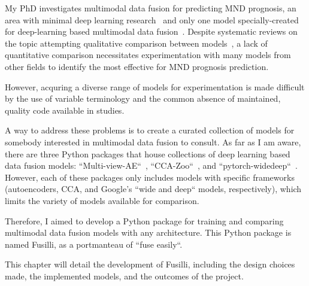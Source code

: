 My PhD investigates multimodal data fusion for predicting MND prognosis, an area with minimal deep learning research~\cite{pancottiDeepLearningMethods2022, mullerExplainableModelsDisease2021} and only one model specially-created for deep-learning based multimodal data fusion~\cite{vanderburghDeepLearningPredictions2017}.
Despite systematic reviews on the topic attempting qualitative comparison between models~\cite{cuiDeepMultimodalFusion2022, gaoSurveyDeepLearning2020, stahlschmidtMultimodalDeepLearning2022, yanDeepMultiviewLearning2021}, a lack of quantitative comparison necessitates experimentation with many models from other fields to identify the most effective for MND prognosis prediction.

However, acquring a diverse range of models for experimentation is made difficult by the use of variable terminology and the common absence of maintained, quality code available in studies.

A way to address these problems is to create a curated collection of models for somebody interested in multimodal data fusion to consult.
As far as I am aware, there are three Python packages that house collections of deep learning based data fusion models: ``Multi-view-AE``~\cite{aguilaMultiviewAEPythonPackage2023}, ``CCA-Zoo``~\cite{chapmanCCAZooCollectionRegularized2021}, and ``pytorch-widedeep``~\cite{zaurinPytorchwidedeepFlexiblePackage2023}.
However, each of these packages only includes models with specific frameworks (autoencoders, CCA, and Google's ``wide and deep`` models, respectively), which limits the variety of models available for comparison.

Therefore, I aimed to develop a Python package for training and comparing multimodal data fusion models with any architecture.
This Python package is named Fusilli, as a portmanteau of ``fuse easily``.

This chapter will detail the development of Fusilli, including the design choices made, the implemented models, and the outcomes of the project.


